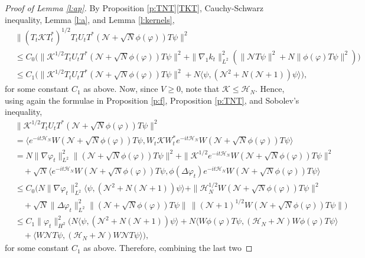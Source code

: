 \documentclass[11pt,a4paper]{scrartcl}
\newcommand{\N}{\mathcal{N}}
\newcommand{\K}{\mathcal{K}}
\begin{document}
\begin{proof}[Proof of Lemma \ref{l:ap}]
  
  By Proposition \ref{p:TNT}\eqref{TKT}, Cauchy-Schwarz inequality, Lemma
  \ref{l:a}, and Lemma \ref{l:kernels},
  \begin{align*}
    & \| (T_t \K T_t^*)^{1/2} T_t U_t T^* ( \N + \sqrt{N} \phi(\varphi) ) T
    \psi \|^2 \\
    & \le C_0 \big( \| \K^{1/2} T_t U_t T^* ( \N + \sqrt{N} \phi(\varphi) ) T
    \psi \|^2 + \| \nabla_1 k_t \|_{L^2}^2 ( \| \N T \psi \|^2 + N \|
    \phi(\varphi) T \psi \|^2) \big) \\
    & \le C_1 \big( \| \K^{1/2} T_t U_t T^* ( \N + \sqrt{N} \phi(\varphi) ) T
    \psi \|^2 + N \langle \psi, (\N^2 + N(\N+1)) \psi \rangle \big),
  \end{align*}
  for some constant $C_1$ as above. Now, since $V \ge 0$, note that $\K \le
  \mathcal{H}_N$. Hence, using again the formulae in Proposition \ref{p:f},
  Proposition \ref{p:TNT}, and Sobolev's inequality,
  \begin{align*}
    & \| \K^{1/2} T_t U_t T^* ( \N + \sqrt{N} \phi(\varphi) ) T \psi \|^2 \\
    & = \langle e^{-it \mathcal{H}_N} W (\N + \sqrt{N} \phi(\varphi)) T \psi,
    W_t \K W_t^* e^{-it \mathcal{H}_N} W (\N + \sqrt{N} \phi(\varphi)) T \psi
    \rangle \\
    & = N \| \nabla \varphi_t \|_{L^2}^2 \| (\N + \sqrt{N} \phi(\varphi)) T
    \psi \|^2 + \| \K^{1/2} e^{-it \mathcal{H}_N} W (\N + \sqrt{N}
    \phi(\varphi) ) T \psi \|^2 \\
    & \quad + \sqrt{N} \langle e^{-it \mathcal{H}_N} W (\N + \sqrt{N}
    \phi(\varphi)) T \psi, \phi(\Delta \varphi_t) e^{-it \mathcal{H}_N} W (\N
    + \sqrt{N} \phi(\varphi)) T \psi \rangle \\
    & \le C_0 \big( N \| \nabla \varphi_t \|_{L^2}^2 \langle \psi, (\N^2 + N
    (\N + 1)) \psi \rangle + \| \mathcal{H}_{N}^{1/2} W (\N + \sqrt{N} \phi
    (\varphi) ) T \psi \|^2 \\
    & \quad + \sqrt{N} \| \Delta \varphi_t \|_{L^2}^2 \| (\N + \sqrt{N}
    \phi(\varphi) ) T \psi \| \, \| (\N+1)^{1/2} W (\N + \sqrt{N}
    \phi(\varphi) ) T \psi \| \big) \\
    & \le C_1 \| \varphi_t \|_{H^2}^2 \big( N \langle \psi, (\N^2 + N (\N +
    1)) \psi \rangle + N \langle W \phi(\varphi) T \psi, (\mathcal{H}_N + \N)
    W \phi(\varphi) T \psi \rangle \\
    & \quad + \langle W \N T \psi, (\mathcal{H}_N + \N) W \N T \psi \rangle
    \big),
  \end{align*}
  for some constant $C_1$ as above. Therefore, combining the last two

\end{proof}
\end{document}
